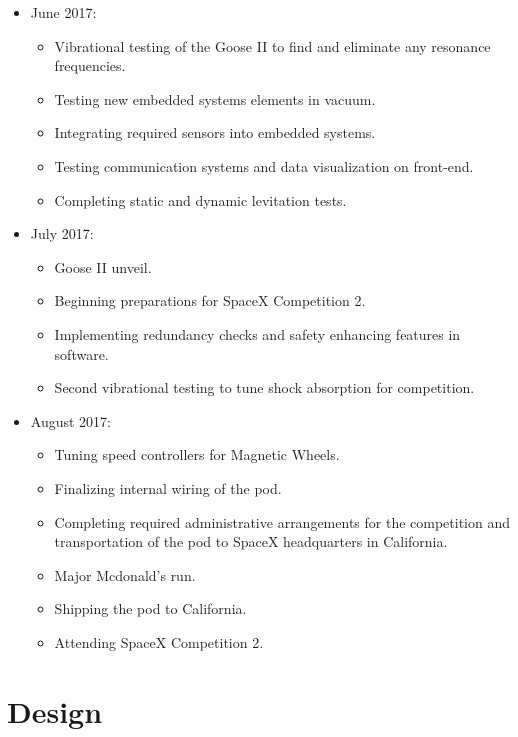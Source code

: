 \documentclass[11pt,a4paper,oldfontcommands]{memoir}
\begin{document}
\begin{itemize}
    \item June 2017:
    \begin{itemize}
        \item Vibrational testing of the Goose II to find and eliminate any resonance frequencies.
        \item Testing new embedded systems elements in vacuum.
        \item Integrating required sensors into embedded systems.
        \item Testing communication systems and data visualization on front-end.
        \item Completing static and dynamic levitation tests.
    \end{itemize}
    
    \item July 2017:
    \begin{itemize}
        \item Goose II unveil.
        \item Beginning preparations for SpaceX Competition 2.
        \item Implementing redundancy checks and safety enhancing features in software.
        \item Second vibrational testing to tune shock absorption for competition.
    \end{itemize}
    
    \item August 2017:
    \begin{itemize}
        \item Tuning speed controllers for Magnetic Wheels.
        \item Finalizing internal wiring of the pod.
        \item Completing required administrative arrangements for the competition and transportation of the pod to SpaceX headquarters in California.
        \item Major Mcdonald's run.
        \item Shipping the pod to California.
        \item Attending SpaceX Competition 2.
    \end{itemize}
    
\end{itemize}

\chapter{Design}
\end{document}
